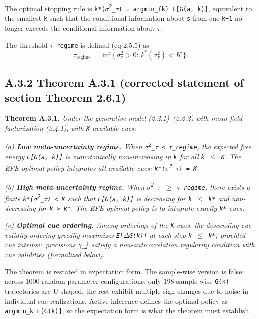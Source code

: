 \documentclass{article}
\begin{document}
The optimal stopping rule is
\texttt{k*(\ensuremath{\sigma}\textsuperscript{2}\_\ensuremath{\tau})\ =\ argmin\_\{k\}\ E{[}G(a,\ k){]}}, equivalent to the
smallest \texttt{k} such that the conditional information about
\texttt{s} from cue \texttt{k+1} no longer exceeds the conditional
information about \texttt{\ensuremath{\tau}}.

The threshold \texttt{\ensuremath{\tau}\_regime} is defined (eq 2.5.5) as \[
\tau_{\mathrm{regime}} = \inf\{\,\sigma^2_\tau > 0 :\, k^*(\sigma^2_\tau) < K\,\}.
\]

\subsection{A.3.2 Theorem A.3.1 (corrected statement of section Theorem
2.6.1)}\label{a.3.2-theorem-a.3.1-corrected-statement-of-chapter-theorem-2.6.1}

\textbf{Theorem A.3.1.} \emph{Under the generative model
(2.2.1)--(2.2.2) with mean-field factorization (2.4.1), with \texttt{K}
available cues:}

\emph{(a) \textbf{Low meta-uncertainty regime.} When
\texttt{\ensuremath{\sigma}\textsuperscript{2}\_\ensuremath{\tau}\ \textless{}\ \ensuremath{\tau}\_regime}, the expected free energy
\texttt{E{[}G(a,\ k){]}} is monotonically non-increasing in \texttt{k}
for all \texttt{k\ \ensuremath{\leq}\ K}. The EFE-optimal policy integrates all
available cues: \texttt{k*(\ensuremath{\sigma}\textsuperscript{2}\_\ensuremath{\tau})\ =\ K}.}

\emph{(b) \textbf{High meta-uncertainty regime.} When
\texttt{\ensuremath{\sigma}\textsuperscript{2}\_\ensuremath{\tau}\ \ensuremath{\geq}\ \ensuremath{\tau}\_regime}, there exists a finite
\texttt{k*(\ensuremath{\sigma}\textsuperscript{2}\_\ensuremath{\tau})\ \textless{}\ K} such that \texttt{E{[}G(a,\ k){]}} is
decreasing for \texttt{k\ \ensuremath{\leq}\ k*} and non-decreasing for
\texttt{k\ \textgreater{}\ k*}. The EFE-optimal policy is to integrate
exactly \texttt{k*} cues.}

\emph{(c) \textbf{Optimal cue ordering.} Among orderings of the
\texttt{K} cues, the descending-cue-validity ordering greedily maximizes
\texttt{E{[}\ensuremath{\Delta}G(k){]}} at each step \texttt{k\ \ensuremath{\leq}\ k*}, provided cue
intrinsic precisions \texttt{\ensuremath{\gamma}\_j} satisfy a non-anticorrelation
regularity condition with cue validities (formalized below).}

The theorem is restated in expectation form. The sample-wise version is
false: across 1000 random parameter configurations, only 198 sample-wise
\texttt{G(k)} trajectories are U-shaped; the rest exhibit multiple sign
changes due to noise in individual cue realizations. Active inference
defines the optimal policy as \texttt{argmin\_k\ E{[}G(k){]}}, so the
expectation form is what the theorem must establish.
\end{document}
